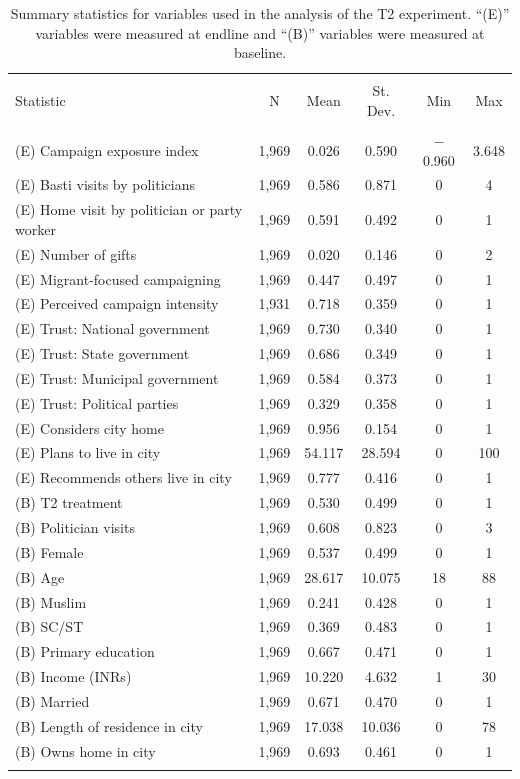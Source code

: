 \documentclass[
  11.5pt,
]{article}
\begin{document}
\begin{table}[!htbp] \centering 
  \caption{Summary statistics for variables used in the analysis of the T2 experiment. ``(E)'' variables were measured at endline and ``(B)'' variables were measured at baseline.} 
  \label{} 
\fontsize{10pt}{10pt}\selectfont
\begin{tabular}{@{\extracolsep{5pt}}lccccc} 
\\[-1.8ex]\hline 
\hline \\[-1.8ex] 
Statistic & \multicolumn{1}{c}{N} & \multicolumn{1}{c}{Mean} & \multicolumn{1}{c}{St. Dev.} & \multicolumn{1}{c}{Min} & \multicolumn{1}{c}{Max} \\ 
\hline \\[-1.8ex] 
(E) Campaign exposure index & 1,969 & 0.026 & 0.590 & $-$0.960 & 3.648 \\ 
(E) Basti visits by politicians & 1,969 & 0.586 & 0.871 & 0 & 4 \\ 
(E) Home visit by politician or party worker & 1,969 & 0.591 & 0.492 & 0 & 1 \\ 
(E) Number of gifts & 1,969 & 0.020 & 0.146 & 0 & 2 \\ 
(E) Migrant-focused campaigning & 1,969 & 0.447 & 0.497 & 0 & 1 \\ 
(E) Perceived campaign intensity & 1,931 & 0.718 & 0.359 & 0 & 1 \\ 
(E) Trust: National government & 1,969 & 0.730 & 0.340 & 0 & 1 \\ 
(E) Trust: State government & 1,969 & 0.686 & 0.349 & 0 & 1 \\ 
(E) Trust: Municipal government & 1,969 & 0.584 & 0.373 & 0 & 1 \\ 
(E) Trust: Political parties & 1,969 & 0.329 & 0.358 & 0 & 1 \\ 
(E) Considers city home & 1,969 & 0.956 & 0.154 & 0 & 1 \\ 
(E) Plans to live in city & 1,969 & 54.117 & 28.594 & 0 & 100 \\ 
(E) Recommends others live in city & 1,969 & 0.777 & 0.416 & 0 & 1 \\ 
(B) T2 treatment & 1,969 & 0.530 & 0.499 & 0 & 1 \\ 
(B) Politician visits & 1,969 & 0.608 & 0.823 & 0 & 3 \\ 
(B) Female & 1,969 & 0.537 & 0.499 & 0 & 1 \\ 
(B) Age & 1,969 & 28.617 & 10.075 & 18 & 88 \\ 
(B) Muslim & 1,969 & 0.241 & 0.428 & 0 & 1 \\ 
(B) SC/ST & 1,969 & 0.369 & 0.483 & 0 & 1 \\ 
(B) Primary education & 1,969 & 0.667 & 0.471 & 0 & 1 \\ 
(B) Income (INRs) & 1,969 & 10.220 & 4.632 & 1 & 30 \\ 
(B) Married & 1,969 & 0.671 & 0.470 & 0 & 1 \\ 
(B) Length of residence in city & 1,969 & 17.038 & 10.036 & 0 & 78 \\ 
(B) Owns home in city & 1,969 & 0.693 & 0.461 & 0 & 1 \\ 
\hline \\[-1.8ex] 
\end{tabular} 
\end{table}
\end{document}
